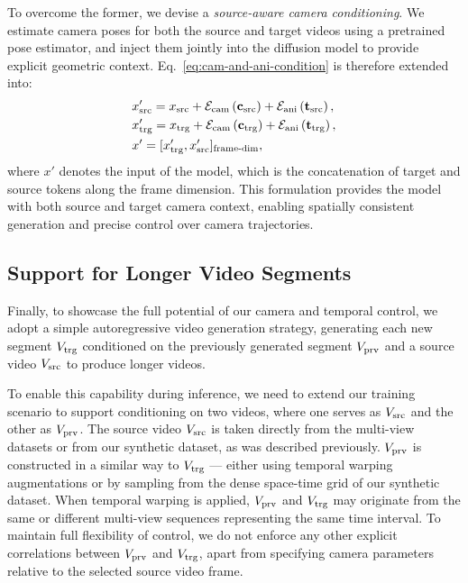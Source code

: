 To overcome the former, we devise a \textit{source-aware camera conditioning}. 
We estimate camera poses for both the source and target videos using a pretrained pose estimator, and inject them jointly into the diffusion model to provide explicit geometric context. Eq.~\ref{eq:cam-and-ani-condition} is therefore extended into:
\begin{align}
&x_{\text{src}}' = x_{\text{src}} + \mathcal{E}_\text{cam}\left(\mathbf{c}_{\text{src}}\right) + \mathcal{E}_\text{ani}\left(\mathbf{t}_{\text{src}}\right), \label{eq-srccam} \\
&x_{\text{trg}}' = x_{\text{trg}} + \mathcal{E}_\text{cam}\left(\mathbf{c}_{\text{trg}}\right) + \mathcal{E}_\text{ani}\left(\mathbf{t}_{\text{trg}}\right), \nonumber \\
&x' = [x_{\text{trg}}', x_{\text{src}}']_{\text{frame-dim}}, \nonumber
\end{align}
where $x'$ denotes the input of the \dit model, which is the concatenation of target and source tokens along the frame dimension. This formulation provides the model with both source and target camera context, enabling spatially consistent generation and precise control over camera trajectories.







\subsection{Support for Longer Video Segments}
\label{sec:LongerVideoSegements}
Finally, to showcase the full potential of our camera and temporal control, we adopt a simple autoregressive video generation strategy, generating each new segment $V_{\text{trg}}$ conditioned on the previously generated segment $V_{\text{prv}}$ and a source video $V_{\text{src}}$ to produce longer videos. 

To enable this capability during inference, we need to extend our training scenario to support conditioning on two videos, where one serves as $V_{\text{src}}$ and the other as $V_{\text{prv}}$.
The source video $V_{\text{src}}$ is taken directly from the multi-view datasets or from our synthetic dataset, as was described previously. 
$V_{\text{prv}}$ is constructed in a similar way to $V_{\text{trg}}$ --- either using temporal warping augmentations or by sampling from the dense space-time grid of our synthetic dataset. 
When temporal warping is applied, $V_{\text{prv}}$ and $V_{\text{trg}}$ may originate from the same or different multi-view sequences representing the same time interval. 
To maintain full flexibility of control, we do not enforce any other explicit correlations between $V_{\text{prv}}$ and $V_{\text{trg}}$, apart from specifying camera parameters relative to the selected source video frame.

